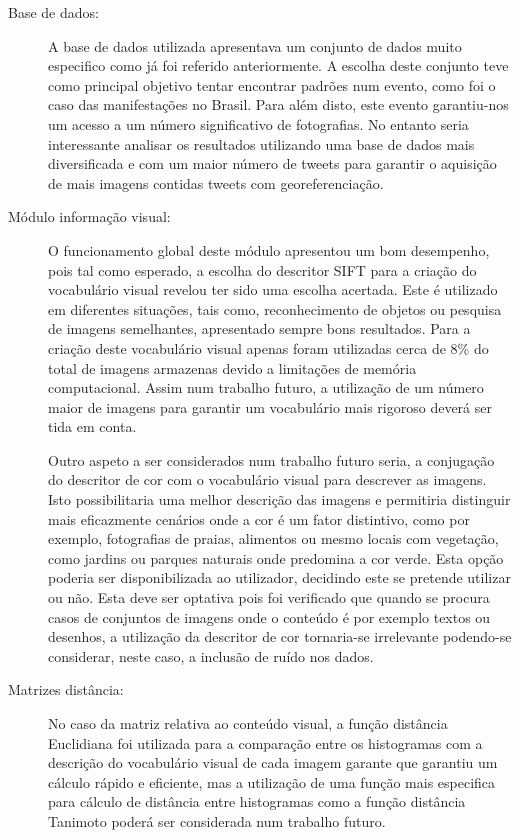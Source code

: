 \begin{description}
\item [Base de dados:] 
A base de dados utilizada apresentava um conjunto de dados muito especifico como já foi referido anteriormente. A escolha deste conjunto teve como principal objetivo tentar encontrar padrões num evento, como foi o caso das manifestações no Brasil. Para além disto, este evento garantiu-nos um acesso a um número significativo de fotografias. No entanto seria interessante analisar os resultados utilizando uma base de dados mais diversificada e com um maior número de tweets para garantir o aquisição de mais imagens contidas tweets com georeferenciação.

\item [Módulo informação visual:]
O funcionamento global deste módulo apresentou um bom desempenho, pois tal como esperado, a escolha do descritor SIFT para a criação do vocabulário visual revelou ter sido uma escolha acertada. Este é utilizado em diferentes situações, tais como, reconhecimento de objetos ou pesquisa de imagens semelhantes, apresentado sempre bons resultados. Para a criação deste vocabulário visual apenas foram utilizadas cerca de 8\% do total de imagens armazenas devido a limitações de memória computacional. Assim num trabalho futuro, a utilização de um número maior de imagens para garantir um vocabulário mais rigoroso deverá ser tida em conta. 

Outro aspeto a ser considerados num trabalho futuro seria, a conjugação do descritor de cor com o vocabulário visual para descrever as imagens. Isto possibilitaria uma melhor descrição das imagens e permitiria distinguir mais eficazmente cenários onde a cor é um fator distintivo, como por exemplo, fotografias de praias, alimentos ou mesmo locais com vegetação, como jardins ou parques naturais onde predomina a cor verde. Esta opção poderia ser disponibilizada ao utilizador, decidindo este se pretende utilizar ou não. Esta deve ser optativa pois foi verificado que quando se procura casos de conjuntos de imagens onde o conteúdo é por exemplo textos ou desenhos, a utilização da descritor de cor tornaria-se irrelevante podendo-se considerar, neste caso, a inclusão de ruído nos dados.

\item [Matrizes distância:]
No caso da matriz relativa ao conteúdo visual, a função distância Euclidiana foi utilizada para a comparação entre os histogramas com a descrição do vocabulário visual de cada imagem garante que garantiu um cálculo rápido e eficiente, mas a utilização de uma função mais especifica para cálculo de distância entre histogramas como a função distância Tanimoto poderá ser considerada num trabalho futuro.


\end{description}
